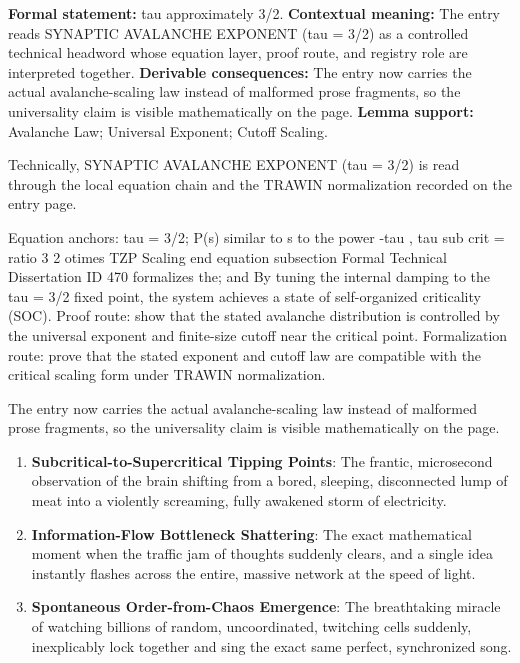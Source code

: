 \begingroup\footnotesize\setlength{\emergencystretch}{3em}\sloppy
\textbf{Formal statement:} tau approximately 3/2. \textbf{Contextual meaning:} The entry reads SYNAPTIC AVALANCHE EXPONENT (tau = 3/2) as a controlled technical headword whose equation layer, proof route, and registry role are interpreted together. \textbf{Derivable consequences:} The entry now carries the actual avalanche-scaling law instead of malformed prose fragments, so the universality claim is visible mathematically on the page. \textbf{Lemma support:} Avalanche Law; Universal Exponent; Cutoff Scaling.\par
\endgroup

Technically, SYNAPTIC AVALANCHE EXPONENT (tau = 3/2) is read through the local equation chain and the TRAWIN normalization recorded on the entry page.

Equation anchors: tau = 3/2; P(s) similar to s to the power -tau , tau sub crit = ratio 3 2 otimes TZP Scaling end equation subsection Formal Technical Dissertation ID 470 formalizes the; and By tuning the internal damping to the tau = 3/2 fixed point, the system achieves a state of self-organized criticality (SOC). Proof route: show that the stated avalanche distribution is controlled by the universal exponent and finite-size cutoff near the critical point. Formalization route: prove that the stated exponent and cutoff law are compatible with the critical scaling form under TRAWIN normalization.

The entry now carries the actual avalanche-scaling law instead of malformed prose fragments, so the universality claim is visible mathematically on the page.
\endgroup

\begin{enumerate}[leftmargin=1.6em,itemsep=6pt,topsep=4pt]
\item \textbf{Subcritical-to-Supercritical Tipping Points}: The frantic, microsecond observation of the brain shifting from a bored, sleeping, disconnected lump of meat into a violently screaming, fully awakened storm of electricity.
\item \textbf{Information-Flow Bottleneck Shattering}: The exact mathematical moment when the traffic jam of thoughts suddenly clears, and a single idea instantly flashes across the entire, massive network at the speed of light.
\item \textbf{Spontaneous Order-from-Chaos Emergence}: The breathtaking miracle of watching billions of random, uncoordinated, twitching cells suddenly, inexplicably lock together and sing the exact same perfect, synchronized song.
\end{enumerate}

